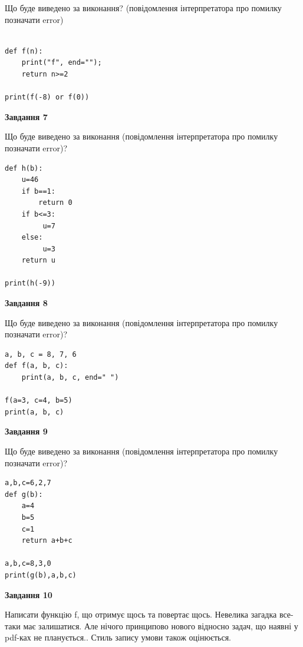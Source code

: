 \documentclass[12pt, ukrainian]{article}
\begin{document}
{\begin {large}
Що буде виведено за виконання? (повідомлення інтерпретатора про помилку позначати error)\par
\begin{verbatim}

def f(n):
    print("f", end="");
    return n>=2

print(f(-8) or f(0))
\end{verbatim}

{\begin {center}\textbf{Завдання 7}\end {center}}

Що буде виведено за виконання (повідомлення інтерпретатора про помилку позначати error)?\par
\begin{verbatim}
def h(b):
    u=46
    if b==1: 
        return 0
    if b<=3:
         u=7
    else:
         u=3
    return u

print(h(-9))
\end{verbatim}

{\begin {center}\textbf{Завдання 8}\end {center}}

Що буде виведено за виконання (повідомлення інтерпретатора про помилку позначати error)?\par
\begin{verbatim}
a, b, c = 8, 7, 6
def f(a, b, c):
    print(a, b, c, end=" ")

f(a=3, c=4, b=5)
print(a, b, c)
\end{verbatim}

{\begin {center}\textbf{Завдання 9}\end {center}}

Що буде виведено за виконання (повідомлення інтерпретатора про помилку позначати error)?\par
\begin{verbatim}
a,b,c=6,2,7
def g(b):
    a=4
    b=5
    c=1
    return a+b+c

a,b,c=8,3,0
print(g(b),a,b,c)
\end{verbatim}

{\begin {center}\textbf{Завдання 10}\end {center}}


Написати функцiю f, що отримує щось та повертає щось. Невелика загадка все-таки має залишатися. Але нічого принципово нового відносно задач, що наявні у pdf-ках не планується.. Стиль запису умови також оцінюється.\par
\end {large}}
\newpage
\end{document}
